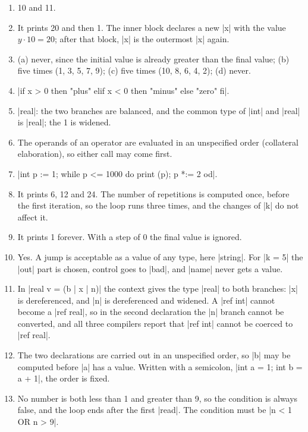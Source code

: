 \begin{enumerate}
\item 10 and 11.
\item It prints 20 and then 1. The inner block declares a new \code|x|
  with the value $y \cdot 10 = 20$; after that block, \code|x| is the
  outermost \code|x| again.
\item (a) never, since the initial value is already greater than the
  final value; (b) five times (1, 3, 5, 7, 9); (c) five times (10, 8, 6,
  4, 2); (d) never.
\item \code|if x > 0 then "plus" elif x < 0 then "minus" else "zero" fi|.
\item \code|real|: the two branches are balanced, and the common type of
  \code|int| and \code|real| is \code|real|; the 1 is widened.
\item The operands of an operator are evaluated in an unspecified order
  (collateral elaboration), so either call may come first.
\item \code|int p := 1; while p <= 1000 do print (p); p *:= 2 od|.
\item It prints 6, 12 and 24. The number of repetitions is computed
  once, before the first iteration, so the loop runs three times, and
  the changes of \code|k| do not affect it.
\item It prints 1 forever. With a step of 0 the final value is ignored.
\item Yes. A jump is acceptable as a value of any type, here
  \code|string|. For \code|k = 5| the \code|out| part is chosen, control
  goes to \code|bad|, and \code|name| never gets a value.
\item In \code|real v = (b | x | n)| the context gives the type
  \code|real| to both branches: \code|x| is dereferenced, and \code|n| is
  dereferenced and widened. A \code|ref int| cannot become a
  \code|ref real|, so in the second declaration the \code|n| branch
  cannot be converted, and all three compilers report that
  \code|ref int| cannot be coerced to \code|ref real|.
\item The two declarations are carried out in an unspecified order, so
  \code|b| may be computed before \code|a| has a value. Written with a
  semicolon, \code|int a = 1; int b = a + 1|, the order is fixed.
\item No number is both less than 1 and greater than 9, so the
  condition is always false, and the loop ends after the first
  \code|read|. The condition must be \code|n < 1 OR n > 9|.
\end{enumerate}

